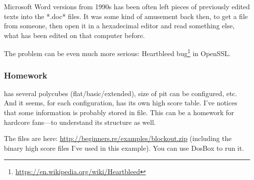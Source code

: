 Microsoft Word versions from 1990s has been often left pieces of previously edited texts into the *.doc* files.
It was some kind of amusement back then, to get a  file from someone,
then open it in a hexadecimal editor and read something else,
what has been edited on that computer before.

The problem can be even much more serious: Heartbleed bug\footnote{\url{https://en.wikipedia.org/wiki/Heartbleed}}
in OpenSSL.

\subsubsection{Homework}

 has several polycubes (flat/basic/extended), size of pit can be configured, etc.
And it seems, for each configuration,  has its own high score table.
I've notices that some information is probably stored in  file.
This can be a homework for hardcore  fans---to understand its structure as well.

The  files are here: \url{http://beginners.re/examples/blockout.zip}
(including the binary high score files
I've used in this example).
You can use DosBox to run it.

